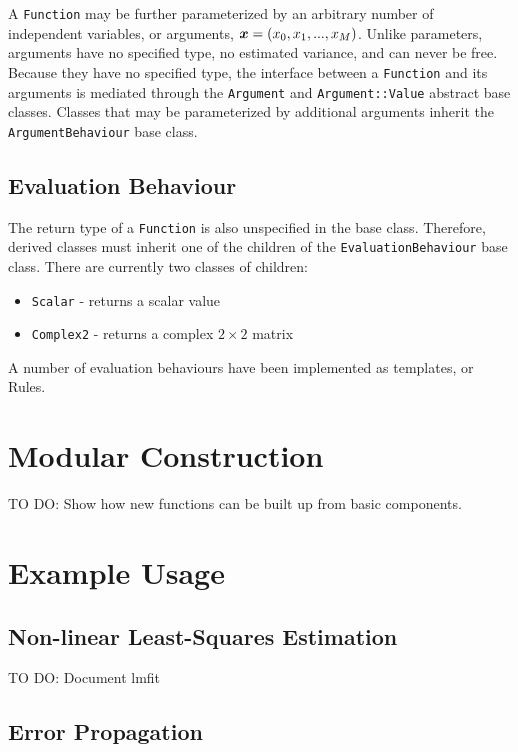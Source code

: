 \documentclass[12pt]{article}
\newcommand{\mbf}[1]{\mbox{\boldmath $#1$}}
\begin{document}
A {\tt Function} may be further parameterized by an arbitrary number of
independent variables, or arguments, ${\mbf x}=(x_0, x_1, ... , x_M)$.
Unlike parameters, arguments have no specified type, no estimated
variance, and can never be free.  Because they have no specified type,
the interface between a {\tt Function} and its arguments is mediated
through the {\tt Argument} and {\tt Argument::Value} abstract base
classes.  Classes that may be parameterized by additional arguments
inherit the {\tt ArgumentBehaviour} base class.

\subsection{Evaluation Behaviour}

The return type of a {\tt Function} is also unspecified in the base
class.  Therefore, derived classes must inherit one of the children of
the {\tt EvaluationBehaviour} base class.  There are currently two
classes of children:
\begin{itemize}
\item {\tt Scalar} - returns a scalar value
\item {\tt Complex2} - returns a complex $2\times2$ matrix
\end{itemize}
A number of evaluation behaviours have been implemented as
templates, or Rules.

\section{Modular Construction}

TO DO: Show how new functions can be built up from basic components.

\section{Example Usage}

\subsection{Non-linear Least-Squares Estimation}

TO DO: Document lmfit

\subsection{Error Propagation}
\end{document}
